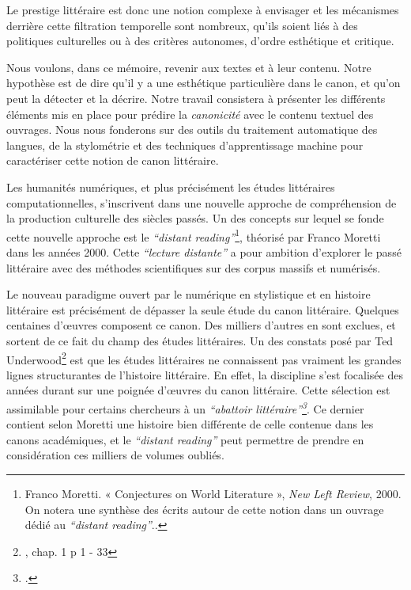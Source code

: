 Le prestige littéraire est donc une notion complexe à envisager et les mécanismes derrière cette filtration temporelle sont nombreux, qu'ils soient liés à des politiques culturelles ou à des critères autonomes, d'ordre esthétique et critique.

Nous voulons, dans ce mémoire, revenir aux textes et à leur contenu. Notre hypothèse est de dire qu'il y a une esthétique particulière dans le canon, et qu'on peut la détecter et la décrire. Notre travail consistera à présenter les différents éléments mis en place pour prédire la \textit{canonicité} avec le contenu textuel des ouvrages. Nous nous fonderons sur des outils du traitement automatique des langues, de la stylométrie et des techniques d'apprentissage machine pour caractériser cette notion de canon littéraire.

Les humanités numériques, et plus précisément les études littéraires computationnelles, s'inscrivent dans une nouvelle approche de compréhension de la production culturelle des siècles passés. Un des concepts sur lequel se fonde cette nouvelle approche est le \textit{\enquote{distant reading}}\footnote{Franco Moretti. « Conjectures on World Literature », \textit{New Left Review}, 2000. On notera une synthèse des écrits autour de cette notion dans un ouvrage dédié au \textit{\enquote{distant reading}}.\cite{moretti_distant_2013}.}, théorisé par Franco Moretti dans les années 2000. Cette \textit{\enquote{lecture distante}} a pour ambition d'explorer le passé littéraire avec des méthodes scientifiques sur des corpus massifs et numérisés. 

Le nouveau paradigme ouvert par le numérique en stylistique et en histoire littéraire est précisément de dépasser la seule étude du canon littéraire. Quelques centaines d'œuvres composent ce canon. Des milliers d'autres en sont exclues, et sortent de ce fait du champ des études littéraires. Un des constats posé par Ted Underwood\footnote{\cite{underwood_distant_2019}, chap. 1 p 1 - 33} est que les études littéraires ne connaissent pas vraiment les grandes lignes structurantes de l'histoire littéraire. En effet, la discipline s'est focalisée des années durant sur une poignée d'œuvres du canon littéraire. Cette sélection est assimilable pour certains chercheurs à un \textit{\enquote{abattoir littéraire}\footcites{moretti_slaughterhouse_2000}}. Ce dernier contient selon Moretti une histoire bien différente de celle contenue dans les canons académiques, et le \textit{\enquote{distant reading}} peut permettre de prendre en considération ces milliers de volumes oubliés. 

